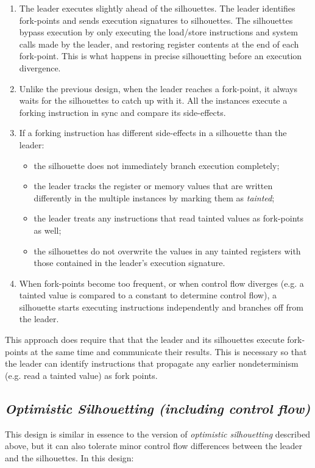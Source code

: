 \begin{enumerate}
\item The leader executes slightly ahead of the silhouettes. 
  The leader identifies fork-points and sends
  execution signatures to silhouettes. 
  The silhouettes bypass execution by only 
  executing the load/store instructions
  and system calls made by the leader,
  and restoring register contents
  at the end of each fork-point.
  This is what happens
  in precise silhouetting before
  an execution divergence.

\item Unlike the previous design,
  when the leader reaches a fork-point, it always waits
  for the silhouettes to catch up with it.
  All the instances execute a forking instruction
  in sync and compare its side-effects.

\item If a forking 
instruction has different
side-effects in a silhouette
than the leader: 
\begin{itemize}
  \item the silhouette does not immediately 
  branch execution completely;
  \item the leader tracks the register or 
  memory values that are written differently
  in the multiple instances
  by marking them as {\em tainted};
  \item the leader treats any instructions that 
  read tainted values as
  fork-points as well;

  \item the silhouettes
  do not overwrite the
  values in any tainted registers
  with those contained in the 
  leader's execution signature.
\end{itemize}

\item When fork-points 
become too frequent, or when
control flow diverges (e.g. a tainted
value is compared to a constant to
determine control flow),
a silhouette starts
executing instructions independently
and branches off from the leader.
\end{enumerate}

\noindent This approach does require that that 
the leader and its silhouettes
execute fork-points at the same time
and communicate their results.
This is necessary so that the leader
can identify instructions
that propagate any earlier
nondeterminism (e.g. read a tainted
value) as fork points.

\subsection{\em Optimistic Silhouetting (including control flow)}\label{opt:sil}
This design is similar in essence to the version of {\em optimistic silhouetting}  
described above, but it can also tolerate minor control flow
differences between the leader and the silhouettes. 
In this design:

